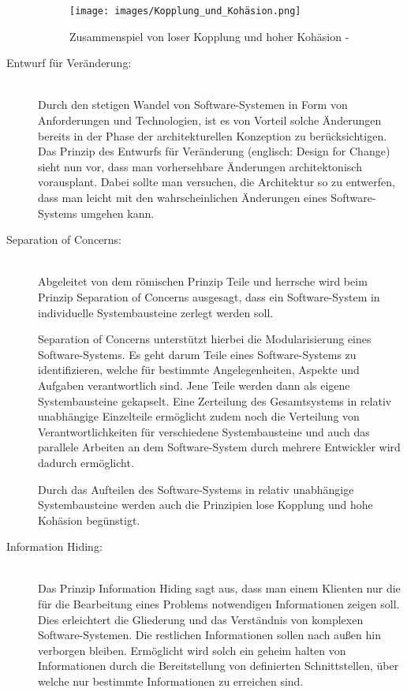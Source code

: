 \begin{description}
    \begin{figure}[H]
        \centering
        \texttt{[image: images/Kopplung\_und\_Kohäsion.png]}
        \caption{Zusammenspiel von loser Kopplung und hoher Kohäsion - \cite{Vogel.2009}}
        \label{fig:kopplung_and_kohaesion}
    \end{figure}

    \item[Entwurf für Veränderung:]\hfill \\
    Durch den stetigen Wandel von Software-Systemen in Form von Anforderungen und Technologien, ist es von Vorteil solche Änderungen bereits in der Phase der architekturellen Konzeption zu berücksichtigen. Das Prinzip des Entwurfs für Veränderung (englisch: Design for Change) sieht nun vor, dass man vorhersehbare Änderungen architektonisch vorausplant. Dabei sollte man versuchen, die Architektur so zu entwerfen, dass man leicht mit den wahrscheinlichen Änderungen eines Software-Systems umgehen kann.

    \item[Separation of Concerns:]\hfill \\
    Abgeleitet von dem römischen Prinzip \glqq Teile und herrsche\grqq{} wird beim Prinzip Separation of Concerns ausgesagt, dass ein Software-System in individuelle Systembausteine zerlegt werden soll.

    Separation of Concerns unterstützt hierbei die Modularisierung eines Software-Systems. Es geht darum Teile eines Software-Systems zu identifizieren, welche für bestimmte Angelegenheiten, Aspekte und Aufgaben verantwortlich sind. Jene Teile werden dann als eigene Systembausteine gekapselt. Eine Zerteilung des Gesamtsystems in relativ unabhängige Einzelteile ermöglicht zudem noch die Verteilung von Verantwortlichkeiten für verschiedene Systembausteine und auch das parallele Arbeiten an dem Software-System durch mehrere Entwickler wird dadurch ermöglicht.

    Durch das Aufteilen des Software-Systems in relativ unabhängige Systembausteine werden auch die Prinzipien lose Kopplung und hohe Kohäsion begünstigt.

    \item[Information Hiding:]\hfill \\
    Das Prinzip Information Hiding sagt aus, dass man einem Klienten nur die für die Bearbeitung eines Problems notwendigen Informationen zeigen soll. Dies erleichtert die Gliederung und das Verständnis von komplexen Software-Systemen. Die restlichen Informationen sollen nach außen hin verborgen bleiben. Ermöglicht wird solch ein geheim halten von Informationen durch die Bereitstellung von definierten Schnittstellen, über welche nur bestimmte Informationen zu erreichen sind.


\end{description}
